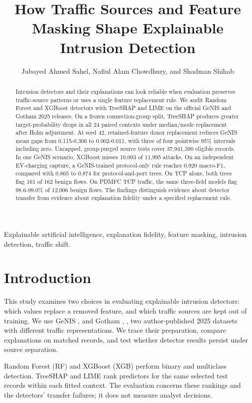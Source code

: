 \documentclass[journal,letterpaper]{IEEEtran}
\begin{document}
\title{How Traffic Sources and Feature Masking Shape Explainable Intrusion Detection}
\author{Jubayed Ahmed Sahel, Nafiul Alam Chowdhury, and Shadman Shihab}
\maketitle
\begin{abstract}
Intrusion detectors and their explanations can look reliable when evaluation preserves traffic-source patterns or uses a single feature replacement rule. We audit Random Forest and XGBoost detectors with TreeSHAP and LIME on the official GeNIS and Gotham 2025 releases. On a frozen connection-group split, TreeSHAP produces greater target-probability drops in all 24 paired contexts under median/mode replacement after Holm adjustment. At seed 42, retained-feature donor replacement reduces GeNIS mean gaps from 0.115-0.306 to 0.002-0.011, with three of four pointwise 95\% intervals including zero. Uncapped, group-purged source tests cover 37,941,390 eligible records. In one GeNIS scenario, XGBoost misses 10,003 of 11,995 attacks. On an independent EV-charging capture, a GeNIS-trained protocol-only rule reaches 0.920 macro-F1, compared with 0.865 to 0.874 for protocol-and-port trees. On TCP alone, both trees flag 161 of 162 benign flows. On PDMFC TCP traffic, the same three-field models flag 98.6-99.0\% of 12,006 benign flows. The findings distinguish evidence about detector transfer from evidence about explanation fidelity under a specified replacement rule.
\end{abstract}
\begin{IEEEkeywords}Explainable artificial intelligence, explanation fidelity, feature masking, intrusion detection, traffic shift.\end{IEEEkeywords}
\section{Introduction}
This study examines two choices in evaluating explainable intrusion detectors: which values replace a removed feature, and which traffic sources are kept out of training. We use GeNIS \cite{ref1}, \cite{ref2} and Gotham \cite{ref3}, \cite{ref4}, two author-published 2025 datasets with different traffic representations. We trace their preparation, compare explanations on matched records, and test whether detector results persist under source separation.

Random Forest (RF) \cite{ref5} and XGBoost (XGB) \cite{ref6} perform binary and multiclass detection. TreeSHAP and LIME rank predictors for the same selected test records within each fitted context. The evaluation concerns these rankings and the detectors' transfer failures; it does not measure analyst decisions.
\end{document}
